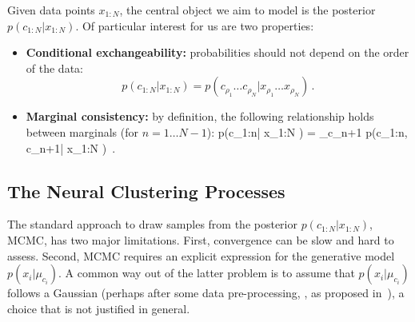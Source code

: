Given data points $x_{1:N}$, the central object we aim to model 
is the posterior $p(c_{1:N}|x_{1:N})$. 
Of particular interest for us are two properties: 
\begin{itemize}
    \item {\bf Conditional exchangeability:}
probabilities should not 
depend on the order of the data: 
\begin{equation}
p(c_{1:N} |x_{1:N}) = 
p(c_{\rho_1}\ldots c_{\rho_N}|x_{\rho_1} \ldots x_{\rho_N} )\,.
\label{eq:exchange}   
\end{equation}

\item {\bf Marginal consistency:}
by definition, the following relationship holds between marginals
(for $n=1 \ldots N-1$): 
\eqan 
p(c_{1:n}| x_{1:N}  )  = 
 \sum_{c_{n+1}} p(c_{1:n}, c_{n+1}| x_{1:N} ) \,. 
 \label{eq:marginal_consistency1}
\enan 
\end{itemize}



\subsection{The Neural Clustering Processes}
\label{sec:amortizing}
The standard approach to draw samples from the posterior $p(c_{1:N}|x_{1:N})$, MCMC, has two major limitations. First, convergence can be slow and hard to assess. Second, MCMC requires an explicit expression for the generative model $p(x_i|\mu_{c_i})$. 
A common way out of the latter problem is to assume that $p(x_i|\mu_{c_i})$ follows a Gaussian
(perhaps after some data pre-processing, \eg, 
as proposed in~\cite{Chang:NIPS:2013:ParallelSamplerDP}),
a choice that is not justified in general. 

